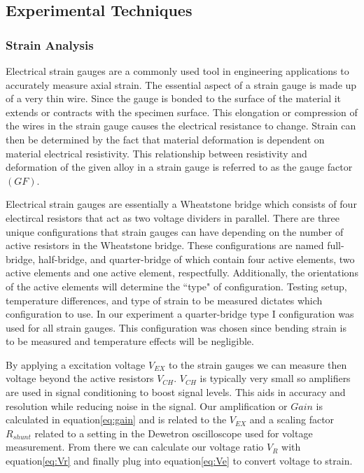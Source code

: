 \documentclass[12pt]{article}
\begin{document}
\subsection{Experimental Techniques} %
\subsubsection{Strain Analysis}
Electrical strain gauges are a commonly used tool in engineering applications to accurately measure axial strain. The essential aspect of a strain gauge is made up of a very thin wire. Since the gauge is bonded to the surface of the material it extends or contracts with the specimen surface.  This elongation or compression of the wires in the strain gauge causes the electrical resistance to change. Strain can then be determined by the fact that material deformation is dependent on material electrical resistivity.  This relationship between resistivity and deformation of the given alloy in a strain gauge is referred to as the gauge factor $(GF)$.  

Electrical strain gauges are essentially a Wheatstone bridge which consists of four  electircal resistors that act as two voltage dividers in parallel. There are three unique configurations that strain gauges can have depending on the number of active resistors in the Wheatstone bridge. These configurations are named full-bridge, half-bridge, and quarter-bridge of which contain four active elements,  two active elements and one active element, respectfully. Additionally, the orientations of the active elements will determine the  ``type" of configuration. Testing setup, temperature differences, and type of strain to be measured dictates which configuration  to use.  In our experiment a quarter-bridge type I configuration was used for all strain gauges. This configuration was chosen since bending strain is to be measured and temperature effects will be negligible. 

By applying a excitation voltage $V_{EX} $ to the strain gauges we can measure then voltage  beyond the active resistors $V_{CH} $.  $V_{CH}$ is typically  very small  so amplifiers are used in signal conditioning to boost signal levels. This aids in accuracy and resolution while reducing noise in the signal. Our amplification  or $Gain$  is calculated in equation\ref{eq:gain}  and is related to the $V_{EX}$ and  a scaling factor $R_{shunt}$  related to a setting in the Dewetron oscilloscope used  for voltage measurement.  From there we can calculate our voltage ratio $V_{R}$ with equation\ref{eq:Vr}  and finally plug into equation\ref{eq:Ve} to convert voltage to strain.
\end{document}
